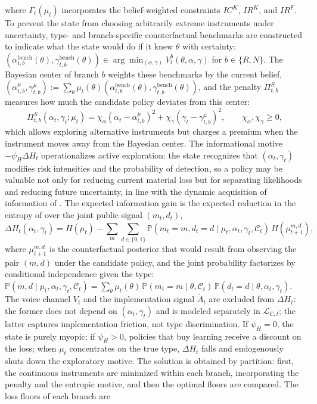 \documentclass[ecta,nameyear,draft]{econsocart}
\theoremstyle{plain}
\theoremstyle{definition}
\newcommand{\Prob}{\mathbb{P}}
\newcommand{\1}{\mathbf{1}}
\begin{document}
where $\Gamma_t(\mu_t)$ incorporates the belief-weighted constraints $IC^K$, $IR^K$, and $IR^F$. To prevent the state from choosing arbitrarily extreme instruments under uncertainty, type- and branch-specific counterfactual benchmarks are constructed to indicate what the state would do if it knew $\theta$ with certainty: $(\alpha_{t,b}^{\mathrm{bench}}(\theta),\gamma_{t,b}^{\mathrm{bench}}(\theta))\in\arg\min_{(\alpha,\gamma)}V_t^b(\theta,\alpha,\gamma)$ for $b\in\{R,N\}$. The Bayesian center of branch $b$ weights these benchmarks by the current belief, $(\alpha_{t,b}^{\mu},\gamma_{t,b}^{\mu}):=\sum_\theta\mu_t(\theta)(\alpha_{t,b}^{\mathrm{bench}}(\theta),\gamma_{t,b}^{\mathrm{bench}}(\theta))$, and the penalty $\Pi_{t,b}^S$ measures how much the candidate policy deviates from this center:
\begin{equation}
\Pi_{t,b}^S(\alpha_t,\gamma_t;\mu_t)=\chi_\alpha(\alpha_t-\alpha_{t,b}^{\mu})^2+\chi_\gamma(\gamma_t-\gamma_{t,b}^{\mu})^2,\qquad\chi_\alpha,\chi_\gamma\ge 0,
\label{eq:prima-desviacion}
\end{equation}
which allows exploring alternative instruments but charges a premium when the instrument moves away from the Bayesian center. The informational motive $-\psi_H\Delta H_t$ operationalizes active exploration: the state recognizes that $(\alpha_t,\gamma_t)$ modifies risk intensities and the probability of detection, so a policy may be valuable not only for reducing current material loss but for separating likelihoods and reducing future uncertainty, in line with the dynamic acquisition of information of \citet{Zhong2022}. The expected information gain is the expected reduction in the entropy of \citet{Shannon1948} over the joint public signal $(m_t,d_t)$,
\begin{equation}
\Delta H_t(\alpha_t,\gamma_t)=H(\mu_t)-\sum_{m}\sum_{d\in\{0,1\}}\Prob(m_t=m,d_t=d\mid\mu_t,\alpha_t,\gamma_t,\mathcal{C}_t)\,H(\mu_{t+1}^{m,d}),
\label{eq:delta-H}
\end{equation}
where $\mu_{t+1}^{m,d}$ is the counterfactual posterior that would result from observing the pair $(m,d)$ under the candidate policy, and the joint probability factorizes by conditional independence given the type: $\Prob(m,d\mid\mu_t,\alpha_t,\gamma_t,\mathcal{C}_t)=\sum_{\theta}\mu_t(\theta)\,\Prob(m_t=m\mid\theta,\mathcal{C}_t)\,\Prob(d_t=d\mid\theta,\alpha_t,\gamma_t)$. The voice channel $V_t$ and the implementation signal $\tilde{A}_t$ are excluded from $\Delta H_t$: the former does not depend on $(\alpha_t,\gamma_t)$ and is modeled separately in $\mathcal{L}_{C,t}$; the latter captures implementation friction, not type discrimination. If $\psi_H=0$, the state is purely myopic; if $\psi_H>0$, policies that buy learning receive a discount on the loss; when $\mu_t$ concentrates on the true type, $\Delta H_t$ falls and endogenously shuts down the exploratory motive. The solution is obtained by partition: first, the continuous instruments are minimized within each branch, incorporating the penalty and the entropic motive, and then the optimal floors are compared. The loss floors of each branch are
\end{document}
